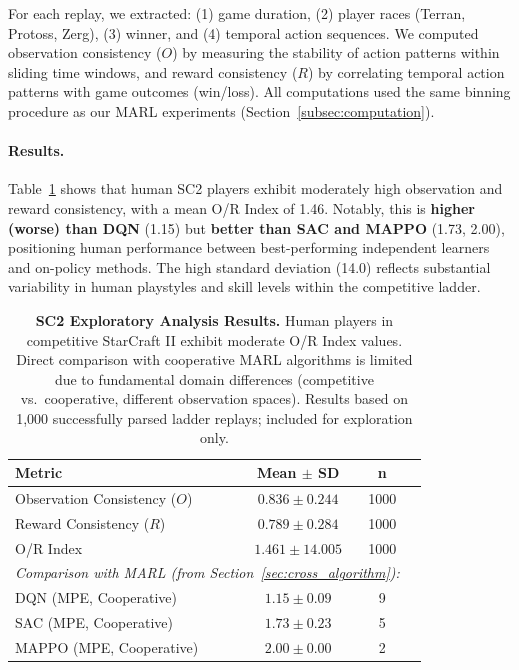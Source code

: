 For each replay, we extracted: (1) game duration, (2) player races (Terran, Protoss, Zerg), (3) winner, and (4) temporal action sequences. We computed observation consistency ($O$) by measuring the stability of action patterns within sliding time windows, and reward consistency ($R$) by correlating temporal action patterns with game outcomes (win/loss). All computations used the same binning procedure as our MARL experiments (Section~\ref{subsec:computation}).

\paragraph{Results.}
Table~\ref{tab:sc2_validation} shows that human SC2 players exhibit moderately high observation and reward consistency, with a mean O/R Index of 1.46. Notably, this is \textbf{higher (worse) than DQN} (1.15) but \textbf{better than SAC and MAPPO} (1.73, 2.00), positioning human performance between best-performing independent learners and on-policy methods. The high standard deviation (14.0) reflects substantial variability in human playstyles and skill levels within the competitive ladder.

\begin{table}[H]
\centering
\caption{\textbf{SC2 Exploratory Analysis Results.} Human players in competitive StarCraft II exhibit moderate O/R Index values. Direct comparison with cooperative MARL algorithms is limited due to fundamental domain differences (competitive vs.\ cooperative, different observation spaces). Results based on 1,000 successfully parsed ladder replays; included for exploration only.}
\label{tab:sc2_validation}
\begin{tabular}{lccc}
\toprule
\textbf{Metric} & \textbf{Mean $\pm$ SD} & \textbf{n} \\
\midrule
Observation Consistency ($O$) & $0.836 \pm 0.244$ & 1000 \\
Reward Consistency ($R$) & $0.789 \pm 0.284$ & 1000 \\
O/R Index & $\mathbf{1.461 \pm 14.005}$ & 1000 \\
\midrule
\multicolumn{3}{l}{\textit{Comparison with MARL (from Section~\ref{sec:cross_algorithm}):}} \\
DQN (MPE, Cooperative) & $1.15 \pm 0.09$ & 9 \\
SAC (MPE, Cooperative) & $1.73 \pm 0.23$ & 5 \\
MAPPO (MPE, Cooperative) & $2.00 \pm 0.00$ & 2 \\
\bottomrule
\end{tabular}
\end{table}

